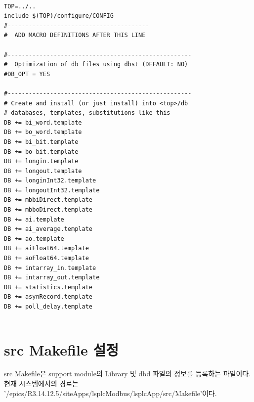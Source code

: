 \documentclass[11pt
  , a4paper
  , article
  , oneside
]{memoir}
\begin{document}
\begin{lstlisting}[style=termstyle]

TOP=../..
include $(TOP)/configure/CONFIG
#----------------------------------------
#  ADD MACRO DEFINITIONS AFTER THIS LINE

#----------------------------------------------------
#  Optimization of db files using dbst (DEFAULT: NO)
#DB_OPT = YES

#----------------------------------------------------
# Create and install (or just install) into <top>/db
# databases, templates, substitutions like this
DB += bi_word.template
DB += bo_word.template
DB += bi_bit.template
DB += bo_bit.template
DB += longin.template
DB += longout.template
DB += longinInt32.template
DB += longoutInt32.template
DB += mbbiDirect.template
DB += mbboDirect.template
DB += ai.template
DB += ai_average.template
DB += ao.template
DB += aiFloat64.template
DB += aoFloat64.template
DB += intarray_in.template
DB += intarray_out.template
DB += statistics.template
DB += asynRecord.template
DB += poll_delay.template


\end{lstlisting}

\section{src Makefile 설정}

src Makefile은 support module의 Library 및 dbd 파일의 정보를 등록하는 파일이다. 현재 시스템에서의 경로는 '/epics/R3.14.12.5/siteApps/lsplcModbus/lsplcApp/src/Makefile'이다.\
\end{document}
